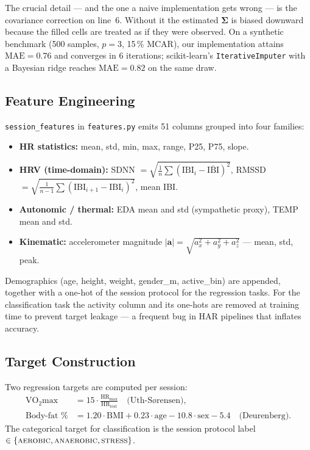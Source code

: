 \documentclass[sigconf,nonacm]{acmart}
\begin{document}
The crucial detail --- and the one a naive implementation gets wrong
--- is the covariance correction on line~6. Without it the estimated
$\boldsymbol{\Sigma}$ is biased downward because the filled cells are
treated as if they were observed. On a synthetic benchmark (500
samples, $p\!=\!3$, 15\,\% MCAR), our implementation attains
$\mathrm{MAE}=0.76$ and converges in 6 iterations; scikit-learn's
\texttt{IterativeImputer} with a Bayesian ridge reaches
$\mathrm{MAE}=0.82$ on the same draw.

\subsection{Feature Engineering}
\texttt{session\_features} in \texttt{features.py} emits 51 columns
grouped into four families:

\begin{itemize}
    \item \textbf{HR statistics:} mean, std, min, max, range, P25, P75, slope.
    \item \textbf{HRV (time-domain):} SDNN
          $=\!\sqrt{\tfrac{1}{n}\sum(\mathrm{IBI}_{i}-\overline{\mathrm{IBI}})^{2}}$,
          RMSSD
          $=\!\sqrt{\tfrac{1}{n-1}\sum(\mathrm{IBI}_{i+1}-\mathrm{IBI}_{i})^{2}}$,
          mean IBI.
    \item \textbf{Autonomic / thermal:} EDA mean and std (sympathetic
          proxy), TEMP mean and std.
    \item \textbf{Kinematic:} accelerometer magnitude
          $|\mathbf{a}|\!=\!\sqrt{a_{x}^{2}+a_{y}^{2}+a_{z}^{2}}$ ---
          mean, std, peak.
\end{itemize}

Demographics (age, height, weight, gender\_m, active\_bin) are
appended, together with a one-hot of the session protocol for the
regression tasks. For the classification task the activity column and
its one-hots are removed at training time to prevent target leakage
--- a frequent bug in HAR pipelines that inflates accuracy.

\subsection{Target Construction}
Two regression targets are computed per session:
\begin{align*}
\text{VO}_{2}\text{max}
     &= 15\cdot\frac{\mathrm{HR}_{\max}}{\mathrm{HR}_{\mathrm{rest}}}
     \quad \text{(Uth-S{\o}rensen)}, \\
\text{Body-fat \%}
     &= 1.20\cdot\mathrm{BMI} + 0.23\cdot\mathrm{age}
        - 10.8\cdot\mathrm{sex} - 5.4
     \quad \text{(Deurenberg)}.
\end{align*}
The categorical target for classification is the session protocol
label $\in\{\textsc{aerobic},\textsc{anaerobic},\textsc{stress}\}$.
\end{document}
